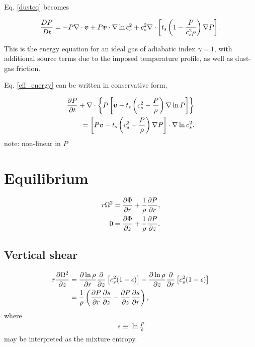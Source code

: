 Eq. \ref{dusteq} becomes

\begin{align}
\frac{DP}{Dt} = - P \nabla\cdot\bm{v} + P\bm{v}\cdot\nabla\ln{c_s^2} +
c_s^2 \nabla\cdot\left[t_\mathrm{s}\left(1 - \frac{P}{c_s^2\rho}\right)\nabla
  P\right]. \label{eff_energy}
\end{align}

This is the energy equation for an ideal gas of adiabatic index
$\gamma=1$, with additional source terms due to the imposed
temperature profile, as well as dust-gas friction.  

Eq. \ref{eff_energy} can be written in conservative form,

\begin{align*}
  \frac{\partial P}{ \partial t} + \nabla\cdot\left\{P\left[\bm{v} -
      t_\mathrm{s}\left(c_s^2 - \frac{P}{\rho}\right)\nabla\ln{P}\right]
    \right\}\\
  = \left[P\bm{v} - t_\mathrm{s}\left(c_s^2 - \frac{P}{\rho}\right)\nabla
    P\right]\cdot\nabla\ln{c_s^2}. 
\end{align*}
note: non-linear in $P$

\section{Equilibrium}

\begin{align}
  r\Omega^2 &= \frac{\partial \Phi}{\partial r} + \frac{1}{\rho}\frac{\partial P}{\partial
    r},\\
  0 & = \frac{\partial\Phi}{\partial z} + \frac{1}{\rho}\frac{\partial P}{\partial z}.
\end{align}

\subsection{Vertical shear}

\begin{align}\label{vshear}
  r\frac{\partial \Omega^2}{\partial z} &= \frac{\partial\ln{\rho}}{\partial r}\frac{\partial}{\partial
    z}\left[c_s^2(1-\epsilon)\right] - \frac{\partial\ln{\rho}}{\partial z}
  \frac{\partial}{\partial r} \left[c_s^2(1-\epsilon)\right]\\  
  & = \frac{1}{\rho}\left(\frac{\partial P}{\partial r}\frac{\partial s}{\partial z} -\frac{\partial
    P}{\partial z}\frac{\partial s}{\partial r} \right),\notag
\end{align}
where
\begin{align}
   s \equiv \ln \frac{P}{\rho}
\end{align}
may be interpreted as the mixture entropy.


